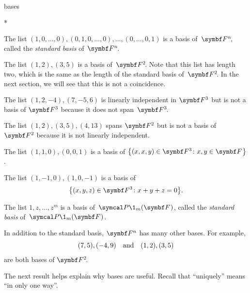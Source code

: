 
\begin{example}[bases]{bases}
\begin{subtheorem}*
\item
The list $
(1, 0, \dots, 0), (0, 1, 0, \dots, 0), \dots, (0, \dots, 0, 1)
$
is a basis of~$\FF{n}$, called the \emph{standard basis}
of~$\FF{n}$.
\item
The list $(1,2), (3,5)$ is a basis of~$\FF{2}$. Note that this list has length two, which is the same as the length of the standard basis of~$\FF2$. In the next section, we will see that this is not a coincidence.
\item
The list $(1,2, -4), (7, -5, 6)$ is linearly independent in $\F3$ but is not a
basis of $\F{3}$ because it does not span~$\FF{3}$.
\item
The list $(1,2), (3,5), (4,13)$ spans $\F{2}$ but is not a basis of $\F{2}$ because it is not linearly independent.
\item
The list $(1, 1, 0), (0, 0, 1) $ is a basis of $\br[\big]{(x, x, y) \in \F{3} \colon x, y \in \F{}}$.
\item
The list $(1, -1, 0), (1, 0, -1) $ is a basis of
\[
\br[\big]{(x, y, z) \in \F{3} \colon x + y + z = 0}.
\]
\item
The list $1, z, \dots, z^m$ is a basis of~$\P\1_m(\F{})$, called the
\emph{standard basis}
of~$\P\1_m(\F{})$.%
\end{subtheorem}
\exampleitemend
\end{example}

In addition to the standard basis, $\F{n}$ has many other bases. For example,
\[
(7, 5), (-4, 9) \quad \text{and} \quad (1,2), (3,5)
\]
are both bases of $\FF{2}$.

The next result helps explain why bases are useful. Recall that ``uniquely'' means ``in only one way''\!.


\pagebreak[3]


